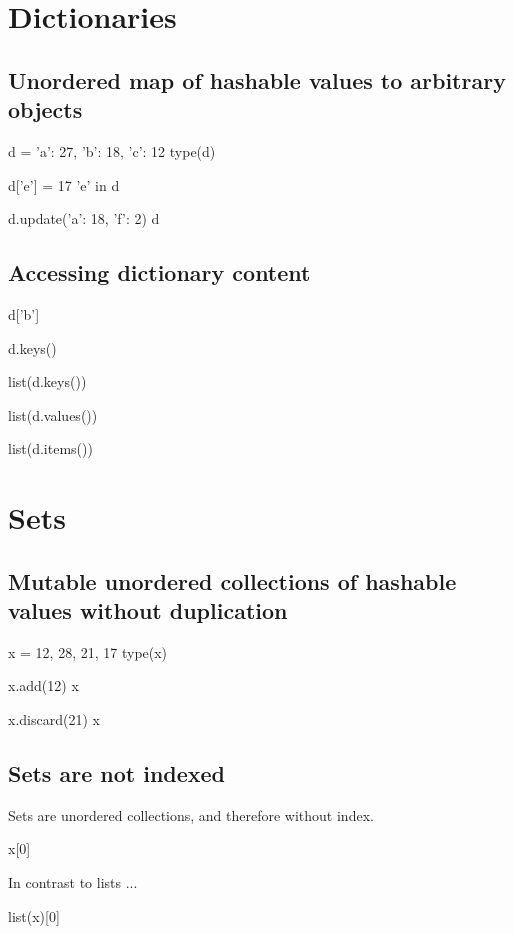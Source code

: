 \documentclass[aspectratio=1610,slidestop]{beamer}
\begin{document}
\section{Dictionaries}
\subsection{Unordered map of hashable values to arbitrary objects}
\begin{pframe}
\begin{pyconsole}
d = {'a': 27, 'b': 18, 'c': 12}
type(d)

d['e'] = 17
'e' in d

d.update({'a': 18, 'f': 2})
d
\end{pyconsole}
\end{pframe}


\subsection{Accessing dictionary content}
\begin{pframe}
\vspace{-0.25cm}
\begin{pyconsole}
d['b']

d.keys()

list(d.keys())

list(d.values())

list(d.items())
\end{pyconsole}
\end{pframe}


\section{Sets}

\subsection{Mutable unordered collections of hashable values without duplication}
\begin{pframe}
\begin{pyconsole}
x = {12, 28, 21, 17}
type(x)

x.add(12)
x

x.discard(21)
x
\end{pyconsole}
\end{pframe}

\subsection{Sets are not indexed}
\begin{pframe}
Sets are unordered collections, and therefore without index.
\begin{pyconsole}
x[0]
\end{pyconsole}
\medskip
\medskip

In contrast to lists ...
\begin{pyconsole}
list(x)[0]
\end{pyconsole}
\end{pframe}
\end{document}
